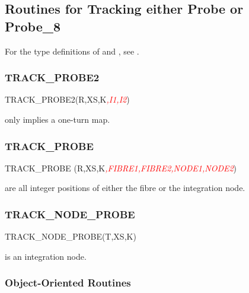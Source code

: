 \subsection{Routines for Tracking either Probe or Probe_8}

%
For the type definitions of  and , see
.


\subsubsection{TRACK_PROBE2}

%
\begin{ptccode}
TRACK_PROBE2(R,XS,K\textit{\textcolor{red}{,I1,I2}})
\end{ptccode}


 only implies a one-turn map.



\subsubsection{TRACK_PROBE}

%
\begin{ptccode}
TRACK_PROBE (R,XS,K\textit{\textcolor{red}{,FIBRE1,FIBRE2,NODE1,NODE2}})
\end{ptccode}

 are all integer positions of either the
fibre or the integration node.


\subsubsection{TRACK_NODE_PROBE}

%
\begin{ptccode}
TRACK_NODE_PROBE(T,XS,K)
\end{ptccode}

 is an integration node.


\subsubsection{Object-Oriented Routines}

